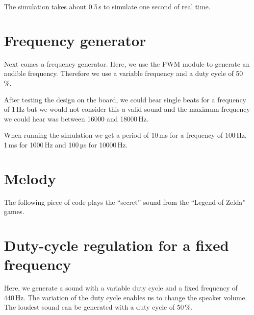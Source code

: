 The simulation takes about 0.5\,s to simulate one second of real time.

\section{Frequency generator}

Next comes a frequency generator. Here, we use the PWM module to generate an audible frequency. Therefore we use a variable frequency and a duty cycle of 50\,\%.







After testing the design on the board, we could hear single beats for a frequency of 1\,Hz but we would not consider this a valid sound and the maximum frequency we could hear was between 16000 and 18000\,Hz.

When running the simulation we get a period of 10\,ms for a frequency of 100\,Hz, 1\,ms for 1000\,Hz and 100\,µs for 10000\,Hz. 

\section{Melody}

The following piece of code plays the ``secret'' sound from the ``Legend of Zelda'' games.



\section{Duty-cycle regulation for a fixed frequency}

Here, we generate a sound with a variable duty cycle and a fixed frequency of 440\,Hz. The variation of the duty cycle enables us to change the speaker volume. The loudest sound can be generated with a duty cycle of 50\,\%. 






